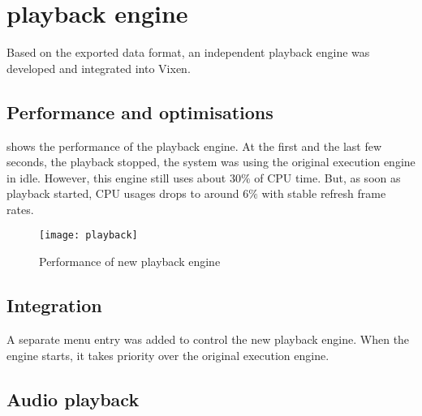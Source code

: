 \chapter{playback engine}
\renewcommand{\baselinestretch}{\mystretch}
\label{chap:Playback}

Based on the exported data format, an independent playback engine was developed and integrated into Vixen. 





\section{Performance and optimisations}




 shows the performance of the playback engine. At the first and the last few seconds, the playback stopped, the system was using the original execution engine in idle. However, this engine still uses about $30 \%$ of CPU time. But, as soon as playback started, CPU usages drops to around $6 \%$ with stable refresh frame rates.

\begin{figure}[t]
    \centering
    \texttt{[image: playback]}
    \caption{Performance of new playback engine}
    \label{fig:playback}
\end{figure}

\section{Integration}

A separate menu entry was added to control the new playback engine. When the engine starts, it takes priority over the original execution engine.

\section{Audio playback}

